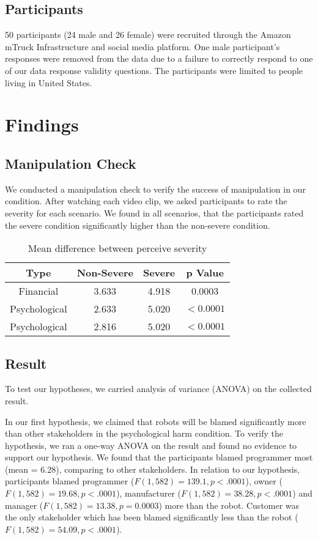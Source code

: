 \documentclass{sigchi}
\begin{document}
\subsection{Participants}
50 participants (24 male and 26 female) were recruited through the Amazon mTruck Infrastructure and social media platform. One male participant's responses were removed from the data due to a failure to correctly respond to one of our data response validity questions. The participants were limited to people living in  United States.

\section{Findings}
\subsection{Manipulation Check}
We conducted a manipulation check to verify the success of manipulation in our condition. After watching each video clip, we asked participants to rate the severity for each scenario. We found in all scenarios, that the participants rated the severe condition significantly higher than the non-severe condition.

\begin{table}
  \centering
  \begin{tabular}{|c|c|c|c|}
    \hline
    Type & Non-Severe & Severe & p Value \\
    \hline
    Financial & 3.633 & 4.918 & 0.0003 \\
    \hline
    Psychological & 2.633 & 5.020 & $ < 0.0001$ \\
    \hline
    Psychological & 2.816 & 5.020 & $ < 0.0001$ \\
    \hline
  \end{tabular}
  \caption{Mean difference between perceive severity}
  \label{tab:table1}
\end{table}

\subsection{Result}
To test our hypotheses, we carried analysis of variance (ANOVA) on the collected result. 

In our first hypothesis, we claimed that robots will be blamed significantly more than other stakeholders in the psychological harm condition. To verify the hypothesis, we ran a one-way ANOVA on the result and found no evidence to support our hypothesis. We found that the participants blamed programmer most (mean = 6.28), comparing to other stakeholders. In relation to our hypothesis, participants blamed programmer ($ F(1,582) =139.1, p < .0001$), owner ($ F(1,582) = 19.68, p < .0001$), manufacturer ($F(1,582) = 38.28, p < .0001$) and manager ($F(1,582) = 13.38, p = 0.0003$) more than the robot. Customer was the only stakeholder which has been blamed significantly less than the robot ($F(1,582) = 54.09, p < .0001$).
\end{document}
